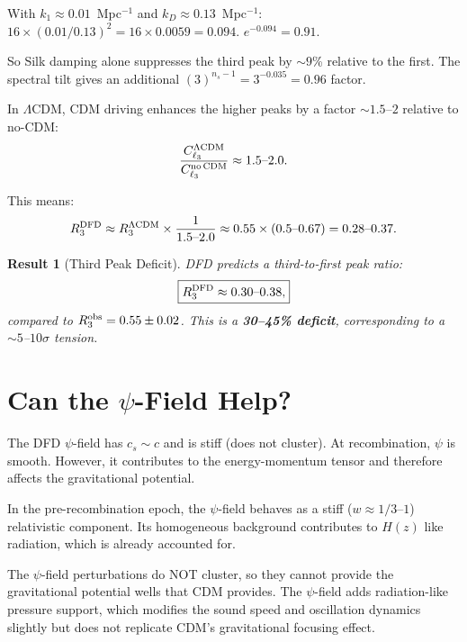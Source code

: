 \documentclass[11pt]{article}
\newtheorem{result}{Result}
\newcommand{\LCDM}{$\Lambda$CDM}
\begin{document}
With $k_1 \approx 0.01$~Mpc$^{-1}$ and $k_D \approx 0.13$~Mpc$^{-1}$:
$16\times(0.01/0.13)^2 = 16\times 0.0059 = 0.094$.
$e^{-0.094} = 0.91$.

So Silk damping alone suppresses the third peak by $\sim 9$\%
relative to the first. The spectral tilt gives an additional
$(3)^{n_s-1} = 3^{-0.035} = 0.96$ factor.

In \LCDM, CDM driving enhances the higher peaks by a factor
$\sim 1.5$--$2$ relative to no-CDM:
\begin{equation}
\frac{C_{\ell_3}^{\Lambda\rm CDM}}{C_{\ell_3}^{\rm no\,CDM}}
\approx 1.5\text{--}2.0.
\end{equation}

This means:
\begin{equation}
R_3^{\rm DFD} \approx R_3^{\Lambda\rm CDM}\times\frac{1}{1.5\text{--}2.0}
\approx 0.55\times(0.5\text{--}0.67) = 0.28\text{--}0.37.
\end{equation}

\begin{result}[Third Peak Deficit]
\label{res:third-peak}
DFD predicts a third-to-first peak ratio:
\begin{equation}
\boxed{R_3^{\rm DFD} \approx 0.30\text{--}0.38,}
\end{equation}
compared to $R_3^{\rm obs} = 0.55 \pm 0.02$. This is a
\textbf{30--45\% deficit}, corresponding to a $\sim 5$--$10\sigma$
tension.
\end{result}

\section{Can the $\psi$-Field Help?}

The DFD $\psi$-field has $c_s \sim c$ and is stiff (does not cluster).
At recombination, $\psi$ is smooth. However, it contributes to the
energy-momentum tensor and therefore affects the gravitational
potential.

In the pre-recombination epoch, the $\psi$-field behaves as a stiff
($w \approx 1/3$--$1$) relativistic component. Its homogeneous
background contributes to $H(z)$ like radiation, which is already
accounted for.

The $\psi$-field perturbations do NOT cluster, so they cannot provide
the gravitational potential wells that CDM provides. The $\psi$-field
adds radiation-like pressure support, which modifies the sound speed
and oscillation dynamics slightly but does not replicate CDM's
gravitational focusing effect.
\end{document}
